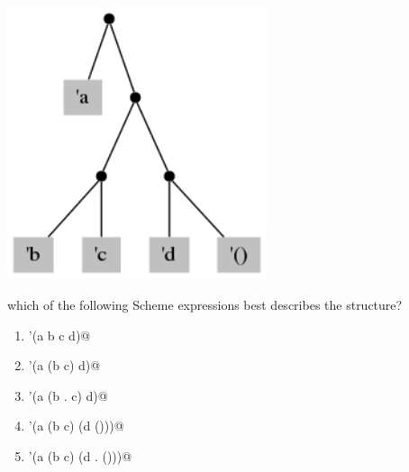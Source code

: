 \documentclass[12pt]{article}
\begin{document}
\begin{enumerate}
  \begin{center}
    \includegraphics[height=80mm]{nest1}\\
  \end{center}

  which of the following Scheme expressions best describes the
  structure?

\begin{enumerate}

\item \verb@'(a b c d)@

\item \verb@'(a (b c) d)@

\item \verb@'(a (b . c) d)@
  
\item \verb@'(a (b c) (d ()))@


\item \verb@'(a (b c) (d . ()))@

\end{enumerate}

\end{enumerate}
\end{document}
